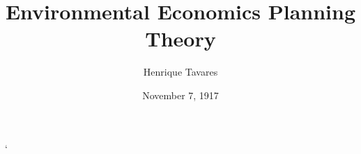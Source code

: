 \documentclass[a4paper,12pt]{book}
\theoremstyle{definition}
\theoremstyle{definition}
\begin{document}
\author{Henrique Tavares}
\title{Environmental Economics Planning Theory}
\date{November 7, 1917}

\frontmatter
\maketitle
\tableofcontents

\mainmatter

`







%
%	
%
%
%	
%
%
%
%
%
%
%
%
%
%
%
%
%
%
% 
%
%
%
%
%
%
%
%
%
%
%
%
%
%
%

\backmatter
\end{document}

